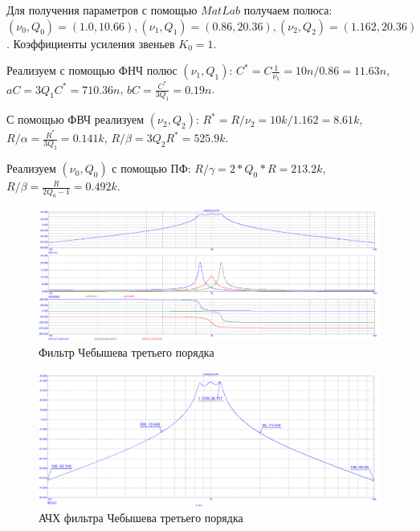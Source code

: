 \documentclass[12pt,a4paper]{article}
\begin{document}
	Для получения параметров с помощью $MatLab$ получаем полюса: $(\nu_0, Q_0) = (1.0, 10.66), (\nu_1, Q_1) = (0.86, 20.36), (\nu_2, Q_2) = (1.162, 20.36)$.
	Коэффициенты усиления звеньев $K_0 = 1$.

	Реализуем с помощью ФНЧ полюс $(\nu_1, Q_1)$: $C^{*} = C \frac{1}{\nu_1} = 10n / 0.86 = 11.63n$, $a C = 3 Q_1 C^{*} = 710.36n$, $bC = \frac{C^{*}}{3 Q_1} = 0.19n$.
	
	С помощью ФВЧ реализуем $(\nu_2, Q_2)$: $R^* = R / \nu_2 = 10k / 1.162 = 8.61k$, $R / \alpha = \frac{R^*}{3Q_2} = 0.141k$, $R / \beta = 3Q_2 R^* = 525.9k$.
	
	Реализуем $(\nu_0, Q_0)$ с помощью ПФ: $R/\gamma = 2 * Q_0 * R = 213.2k$, $R/\beta = \frac{R}{2 Q_0 - 1} = 0.492k$.
	
	
	\begin{figure}[H]
		\centering
		\includegraphics[width=1.0\linewidth]{res/cheb6pole.png}
		\caption{Фильтр Чебышева третьего порядка}
		\label{ach}
	\end{figure}
	
	\begin{figure}[H]
		\centering
		\includegraphics[width=1.0\linewidth]{res/cheb6pole_ach.png}
		\caption{АЧХ фильтра Чебышева третьего порядка}
		\label{ach}
	\end{figure}
	
	
	
\end{document}
